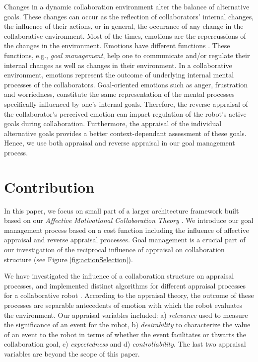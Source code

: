 \documentclass[conference]{IEEEtran}
\begin{document}
Changes in a dynamic collaboration environment alter the balance of alternative
goals. These changes can occur as the reflection of collaborators' internal
changes, the influence of their actions, or in general, the occurance of any
change in the collaborative environment. Most of the times, emotions are the
repercussions of the changes in the environment. Emotions have different
functions \cite{scheutz:architectural-action-selection}. These functions, e.g.,
\textit{goal management}, help one to communicate and/or regulate their internal
changes as well as changes in their environment. In a collaborative environment,
emotions represent the outcome of underlying internal mental processes of the
collaborators. Goal-oriented emotions such as anger, frustration and
worriedness, constitute the same representation of the mental processes
specifically influenced by one's internal goals. Therefore, the reverse
appraisal \cite{gratch:reverse-appraisal} of the collaborator's perceived
emotion can impact regulation of the robot's active goals during collaboration.
Furthermore, the appraisal of the individual alternative goals provides a better
context-dependant assessment of these goals. Hence, we use both appraisal and
reverse appraisal in our goal management process.


\vspace*{-2mm}
\section{Contribution}

In this paper, we focus on small part of a larger architecture framework
built based on our \textit{Affective Motivational Collaboration Theory}
\cite{shayganfar:amct-symbiotic}. We introduce our goal management process based
on a cost function including the influence of affective appraisal and reverse
appraisal processes. Goal management is a crucial part of our investigation of
the reciprocal influence of appraisal on collaboration structure (see Figure
\ref{fig:actionSelection}).

We have investigated the influence of a collaboration structure on
appraisal processes, and implemented distinct algorithms for different
appraisal processes for a collaborative robot \cite{shayganfar:appraisal}.
According to the appraisal theory, the outcome of these processes are separable
antecedents of emotion with which the robot evaluates the environment. Our
appraisal variables included: a) \textit{relevance} used to measure the
significance of an event for the robot, b) \textit{desirability} to characterize
the value of an event to the robot in terms of whether the event facilitates or
thwarts the collaboration goal, c) \textit{expectedness} and d)
\textit{controllability}. The last two appraisal variables are beyond the scope
of this paper.
\end{document}
